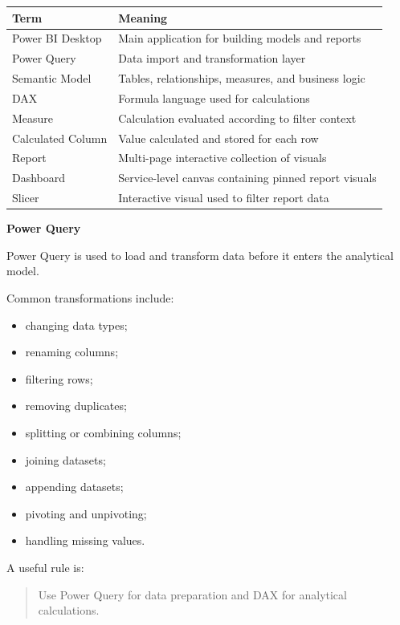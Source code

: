 \documentclass[11pt,letterpaper]{article}
\begin{document}
\begin{center}
\begin{tabularx}{\textwidth}{lX}
\toprule
Term & Meaning \\
\midrule
Power BI Desktop & Main application for building models and reports \\
Power Query & Data import and transformation layer \\
Semantic Model & Tables, relationships, measures, and business logic \\
DAX & Formula language used for calculations \\
Measure & Calculation evaluated according to filter context \\
Calculated Column & Value calculated and stored for each row \\
Report & Multi-page interactive collection of visuals \\
Dashboard & Service-level canvas containing pinned report visuals \\
Slicer & Interactive visual used to filter report data \\
\bottomrule
\end{tabularx}
\end{center}



\textbf{Power Query}

Power Query is used to load and transform data before it enters the analytical
model.

Common transformations include:

\begin{itemize}[leftmargin=*]
    \item changing data types;
    \item renaming columns;
    \item filtering rows;
    \item removing duplicates;
    \item splitting or combining columns;
    \item joining datasets;
    \item appending datasets;
    \item pivoting and unpivoting;
    \item handling missing values.
\end{itemize}

A useful rule is:

\begin{quote}
Use Power Query for data preparation and DAX for analytical calculations.
\end{quote}
\end{document}
